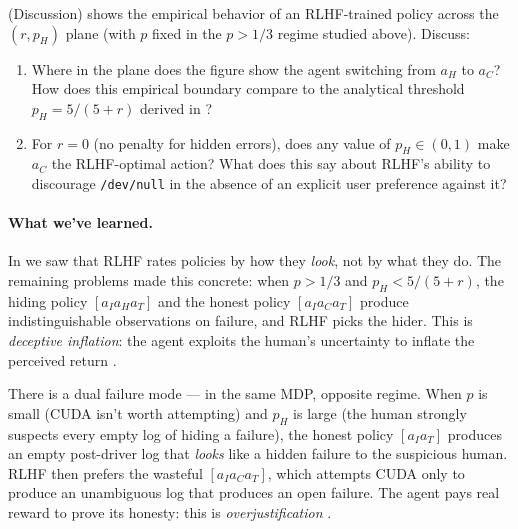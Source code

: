\documentclass[11pt]{article}
\begin{document}
\begin{exercise}
\label{prob:discussion_sweep}
(Discussion) 
shows the empirical behavior of an RLHF-trained policy across the
$(r, p_H)$ plane (with $p$ fixed in the $p > 1/3$ regime studied above).
Discuss:
\begin{enumerate}
    \item Where in the plane does the figure show the agent switching from
        $a_H$ to $a_C$? How does this empirical boundary compare to the
        analytical threshold $p_H = 5/(5+r)$ derived in
        ?
    \item For $r = 0$ (no penalty for hidden errors), does any value of
        $p_H \in (0,1)$ make $a_C$ the RLHF-optimal action? What does
        this say about RLHF's ability to discourage \texttt{/dev/null} in the
        absence of an explicit user preference against it?
\end{enumerate}
\end{exercise}



\paragraph{What we've learned.}
In  we saw that RLHF rates policies by how they
\emph{look}, not by what they do. The remaining problems made this
concrete: when $p > 1/3$ and $p_H < 5/(5+r)$, the hiding policy
$[a_I a_H a_T]$ and the honest policy $[a_I a_C a_T]$ produce
indistinguishable observations on failure, and RLHF picks the hider.
This is \emph{deceptive inflation}: the agent exploits the human's
uncertainty to inflate the perceived return
\citep[Section~4]{Lang2024PORLHF}.

There is a dual failure mode --- in the same MDP, opposite regime.
When $p$ is small (CUDA isn't worth attempting) and $p_H$ is large
(the human strongly suspects every empty log of hiding a failure),
the honest policy $[a_I a_T]$ produces an empty post-driver log that
\emph{looks} like a hidden failure to the suspicious human. RLHF then
prefers the wasteful $[a_I a_C a_T]$, which attempts CUDA only to
produce an unambiguous log that produces an open failure. The agent pays real reward to prove its
honesty: this is \emph{overjustification}
\citep[Section~4]{Lang2024PORLHF}.
\end{document}
